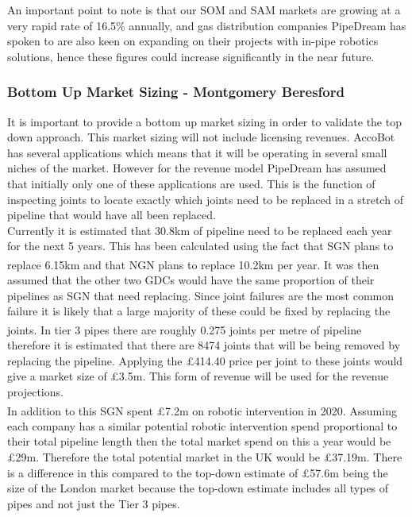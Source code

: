\documentclass[11pt]{article}		%
\newcommand{\supercite}[1]{\textsuperscript{\cite{#1}}}		%
\begin{document}
    An important point to note is that our SOM and SAM markets are growing at a very rapid rate of 16.5\% annually, and gas distribution companies PipeDream has spoken to are also keen on expanding on their projects with in-pipe robotics solutions, hence these figures could increase significantly in the near future.
    
    \subsubsection[Bottom Up Market Sizing]{Bottom Up Market Sizing - Montgomery Beresford} \label{bottomUp}
	    It is important to provide a bottom up market sizing in order to validate the top down approach. This market sizing will not include licensing revenues.
	 AccoBot has several applications which means that it will be operating in several small niches of the market. However for the revenue model PipeDream has assumed that initially only one of these applications are used. This is the function of inspecting joints to locate exactly which joints need to be replaced in a stretch of pipeline that would have all been replaced. 
	\\
	Currently it is estimated that 30.8km of pipeline need to be replaced each year for the next 5 years. This has been calculated using the fact that SGN plans to replace 6.15km \supercite{SGN_Southern}\supercite{SGN_Scotland} and that NGN plans to replace 10.2km per year\supercite{NGN_decisions}. It was then assumed that the other two GDCs would have the same proportion of their pipelines as SGN that need replacing. Since joint failures are the most common failure it is likely that a large majority of these could be fixed by replacing the joints. In tier 3 pipes there are roughly 0.275 joints per metre of pipeline \supercite{SGN_Southern} therefore it is estimated that there are 8474 joints that will be being removed by replacing the pipeline. Applying the £414.40 price per joint to these joints would give a market size of £3.5m. This form of revenue will be used for the revenue projections.
	\\
	In addition to this SGN spent £7.2m on robotic intervention in 2020.\supercite{SGN_Scotland}\supercite{SGN_Southern} Assuming each company has a similar potential robotic intervention spend proportional to their total pipeline length then the total market spend on this a year would be £29m. Therefore the total potential market in the UK would be £37.19m. There is a difference in this compared to the top-down estimate of £57.6m being the size of the London market because the top-down estimate includes all types of pipes and not just the Tier 3 pipes. 
    		        
\end{document}

